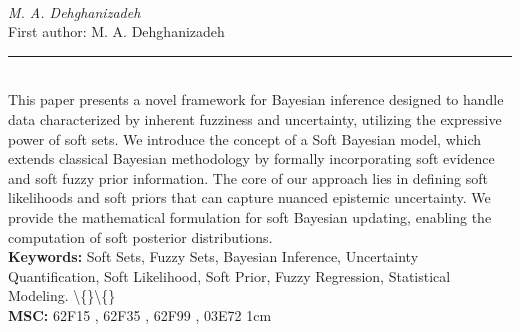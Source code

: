 \documentclass[10pt,twoside]{article}
\begin{document}
\noindent\begin{minipage}[t][\textheight]{\textwidth}
\\[0.35em]
{\itshape M. A. Dehghanizadeh}\\[0.2em]
{\footnotesize First author: M. A. Dehghanizadeh}\\[0.45em]
\noindent\rule{\textwidth}{0.3pt}\\[0.4em]
{\footnotesize  This paper presents a novel framework for Bayesian inference designed to handle data characterized by inherent fuzziness and uncertainty, utilizing the expressive power of soft sets. We introduce the concept of a Soft Bayesian model, which extends classical Bayesian methodology by formally incorporating soft evidence and soft fuzzy prior information. The core of our approach lies in defining soft likelihoods and soft priors that can capture nuanced epistemic uncertainty. We provide the mathematical formulation for soft Bayesian updating, enabling the computation of soft posterior distributions.}\\[0.4em]
{\footnotesize\bfseries Keywords:} {\footnotesize Soft Sets, Fuzzy Sets, Bayesian Inference, Uncertainty Quantification, Soft Likelihood, Soft Prior, Fuzzy Regression, Statistical Modeling. \textbackslash\{\}\textbackslash\{\}}\\[0.15em]
{\footnotesize\bfseries MSC:} {\footnotesize 62F15 , 62F35 , 62F99 , 03E72 1cm}\\
\vfill
\end{minipage}
\newpage
\end{document}
